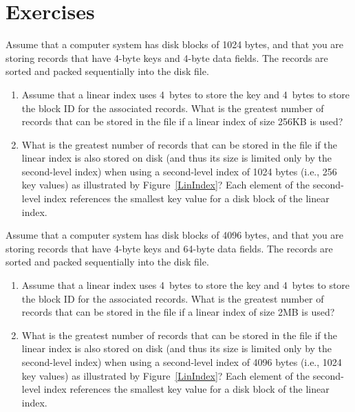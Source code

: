 \section{Exercises}

\begin{exercises}

\item
Assume that a computer system has disk blocks of 1024 bytes, and that
you are storing records that have 4-byte keys and 4-byte data fields.
The records are sorted and packed sequentially into the disk file.

\begin{enumerate}
\item Assume that a linear index uses 4~bytes to store the key and
4~bytes to store the block ID for the associated records.
What is the greatest number of records that can be stored in the 
file if a linear index of size 256KB is used?

\item What is the greatest number of records that can be stored in the 
file if the linear index is also stored on disk (and thus its size is
limited only by the second-level index) when using a second-level
index of 1024 bytes (i.e., 256 key values) as illustrated by
Figure~\ref{LinIndex}?
Each element of the second-level index references the smallest key
value for a disk block of the linear index.
\end{enumerate}

\item
Assume that a computer system has disk blocks of 4096 bytes, and that
you are storing records that have 4-byte keys and 64-byte data fields.
The records are sorted and packed sequentially into the disk file.

\begin{enumerate}
\item Assume that a linear index uses 4~bytes to store the key and
4~bytes to store the block ID for the associated records.
What is the greatest number of records that can be stored in the 
file if a linear index of size 2MB is used?

\item What is the greatest number of records that can be stored in the
file if the linear index is also stored on disk (and thus its size is
limited only by the second-level index) when using a second-level
index of 4096 bytes (i.e., 1024 key values) as illustrated by
Figure~\ref{LinIndex}?
Each element of the second-level index references the smallest key
value for a disk block of the linear index.
\end{enumerate}


\end{exercises}
